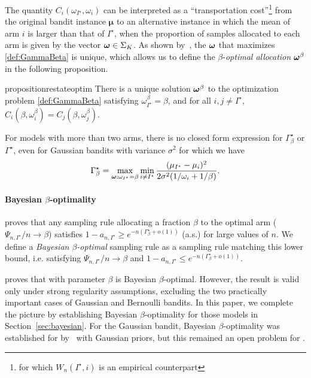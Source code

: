 The quantity $C_i(\omega_{I^\star},\omega_i)$ can be interpreted as a ``transportation cost''\footnote{for which $W_n(I^\star,i)$ is an empirical counterpart} from the original bandit instance $\bm\mu$ to an alternative instance in which the mean of arm $i$ is larger than that of $I^\star$, when the proportion of samples allocated to each arm is given by the vector ${\boldsymbol \omega} \in \Sigma_K$. As shown by~\cite{russo2016ttts}, the ${\boldsymbol \omega}$ that maximizes \eqref{def:GammaBeta} is unique, which allows us to define the $\beta$-\emph{optimal allocation} ${\boldsymbol \omega}^\beta$ in the following proposition.
\begin{restatable}{proposition}{restateoptim}\label{prop:optim}
There is a unique solution ${\boldsymbol \omega}^\beta$ to the optimization problem \eqref{def:GammaBeta}
satisfying $\omega_{I^\star}^\beta = \beta$, and for all $i,j \neq I^\star$, $C_i(\beta,\omega_i^\beta) = C_j(\beta,\omega_j^\beta)$.
\end{restatable}

For models with more than two arms, there is no closed form expression for $\Gamma_\beta^\star$ or $\Gamma^\star$, even for Gaussian bandits  with variance $\sigma^2$ for which we have
\[
    \Gamma_{\beta}^\star = \max_{{\boldsymbol \omega}:\omega_{I^\star}=\beta}\min_{i\neq I^\star} \frac{(\mu_{I^\star}-\mu_i)^2}{2\sigma^2(1/\omega_i+1/\beta)}.
\]


\paragraph{Bayesian $\beta$-optimality} \citet{russo2016ttts} proves that  any sampling rule allocating a fraction $\beta$ to the optimal arm ($\Psi_{n,I^\star}/n \rightarrow \beta$) satisfies %
$1-a_{n, I^\star} \geq e^{-n(\Gamma_{\beta}^\star + o(1))}$ (a.s.) for large values of $n$. We define a  \emph{Bayesian $\beta$-optimal} sampling rule as a sampling rule matching this lower bound, i.e. satisfying $\Psi_{n,I^\star}/n \rightarrow \beta$ and $1- a_{n, I^\star} \leq e^{-n(\Gamma_{\beta}^\star + o(1))}$.

\citet{russo2016ttts} proves that \TTTS with parameter $\beta$ is Bayesian $\beta$-optimal.
However, the result is valid only under strong regularity assumptions, excluding the two practically important cases of Gaussian and Bernoulli bandits. In this paper, we complete the picture by establishing Bayesian $\beta$-optimality for those models in Section~\ref{sec:bayesian}. For the Gaussian bandit, Bayesian $\beta$-optimality was established for \TTEI by~\cite{qin2017ttei} with Gaussian priors, but this remained an open problem for \TTTS.

